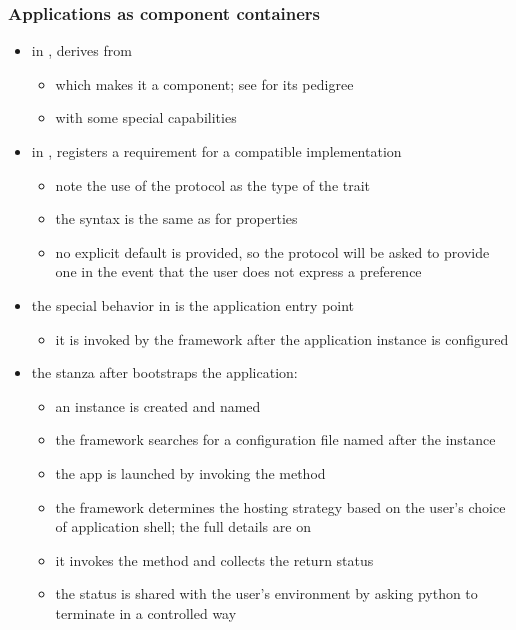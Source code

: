 \begin{frame}
%
  \frametitle{Applications as component containers}
%
  \begin{itemize}
%
  \item in ,  derives from
    \begin{itemize}
    \item which makes it a component; see  for its pedigree
    \item with some special capabilities
    \end{itemize}
%
  \item in ,  registers a requirement for a
     compatible implementation
    \begin{itemize}
    \item note the use of the protocol as the type of the trait
    \item the syntax is the same as for properties
    \item no explicit default is provided, so the protocol will be asked to provide one in the
      event that the user does not express a preference
    \end{itemize}
%
  \item the special behavior  in  is the application
    entry point
    \begin{itemize}
    \item it is invoked by the framework after the application instance is configured
    \end{itemize}
%
  \item the stanza after  bootstraps the application:
    \begin{itemize}
    \item an instance is created and named
    \item the framework searches for a configuration file named after the instance
    \item the app is launched by invoking the method 
    \item the framework determines the hosting strategy based on the user's choice of
      application shell; the full details are on 
    \item it invokes the method  and collects the return status
    \item the status is shared with the user's environment by asking python to terminate in a
      controlled way
    \end{itemize}
%
  \end{itemize}
%
\end{frame}

